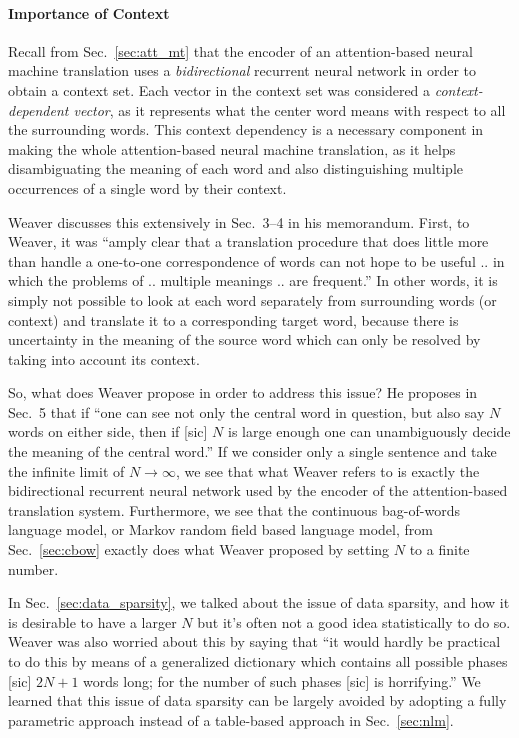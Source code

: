 \documentclass{report}
\begin{document}
\paragraph{Importance of Context}

Recall from Sec.~\ref{sec:att_mt} that the encoder of an attention-based neural
machine translation uses a {\em bidirectional} recurrent neural network in order
to obtain a context set. Each vector in the context set was considered a {\em
context-dependent vector}, as it represents what the center word means with
respect to all the surrounding words. This context dependency is a necessary
component in making the whole attention-based neural machine translation, as it
helps disambiguating the meaning of each word and also distinguishing multiple
occurrences of a single word by their context.

Weaver discusses this extensively in Sec.~3--4 in his memorandum. First, to
Weaver, it was ``amply clear that a translation procedure that does little more
than handle a one-to-one correspondence of words can not hope to be useful .. in
which the problems of .. multiple meanings .. are frequent.'' In other words, it
is simply not possible to look at each word separately from surrounding words
(or context) and translate it to a corresponding target word, because there is
uncertainty in the meaning of the source word which can only be resolved by
taking into account its context.

So, what does Weaver propose in order to address this issue? He proposes in
Sec.~5 that if ``one can see not only the central word in question, but also say
$N$ words on either side, then if [sic] $N$ is large enough one can
unambiguously decide the meaning of the central word.'' If we consider only a
single sentence and take the infinite limit of $N \to \infty$, we see that what
Weaver refers to is exactly the bidirectional recurrent neural network used by
the encoder of the attention-based translation system.  Furthermore, we see that
the continuous bag-of-words language model, or Markov random field based
language model, from Sec.~\ref{sec:cbow} exactly does what Weaver proposed by
setting $N$ to a finite number.

In Sec.~\ref{sec:data_sparsity}, we talked about the issue of data sparsity, and
how it is desirable to have a larger $N$ but it's often not a good idea
statistically to do so. Weaver was also worried about this by saying that ``it
would hardly be practical to do this by means of a generalized dictionary which
contains all possible phases [sic] $2N+1$ words long; for the number of such
phases [sic] is horrifying.'' We learned that this issue of data sparsity can be
largely avoided by adopting a fully parametric approach instead of a
table-based approach in Sec.~\ref{sec:nlm}.
\end{document}
